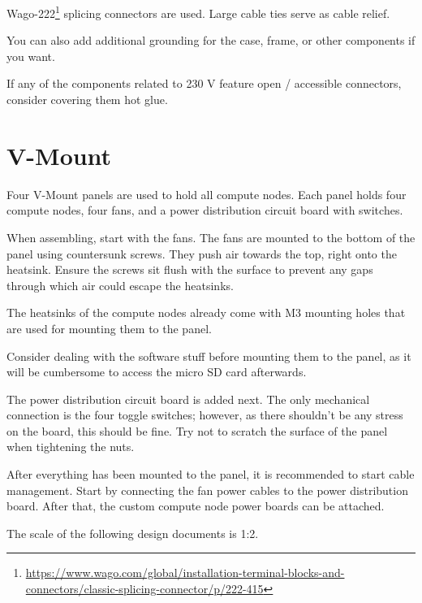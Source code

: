 Wago-222\footnote{\url{https://www.wago.com/global/installation-terminal-blocks-and-connectors/classic-splicing-connector/p/222-415}} splicing connectors are used.
Large cable ties serve as cable relief.

You can also add additional grounding for the case, frame, or other components if you want.

If any of the components related to 230 V feature open / accessible connectors, consider covering them hot glue.



\section{V-Mount}

Four V-Mount panels are used to hold all compute nodes.
Each panel holds four compute nodes, four fans, and a power distribution circuit board with switches.

When assembling, start with the fans.
The fans are mounted to the bottom of the panel using countersunk screws.
They push air towards the top, right onto the heatsink.
Ensure the screws sit flush with the surface to prevent any gaps through which air could escape the heatsinks.

The heatsinks of the compute nodes already come with M3 mounting holes that are used for mounting them to the panel.

Consider dealing with the software stuff before mounting them to the panel, as it will be cumbersome to access the micro SD card afterwards.

The power distribution circuit board is added next.
The only mechanical connection is the four toggle switches; however, as there shouldn't be any stress on the board, this should be fine.
Try not to scratch the surface of the panel when tightening the nuts.

After everything has been mounted to the panel, it is recommended to start cable management.
Start by connecting the fan power cables to the power distribution board.
After that, the custom compute node power boards can be attached.

The scale of the following design documents is 1:2.


